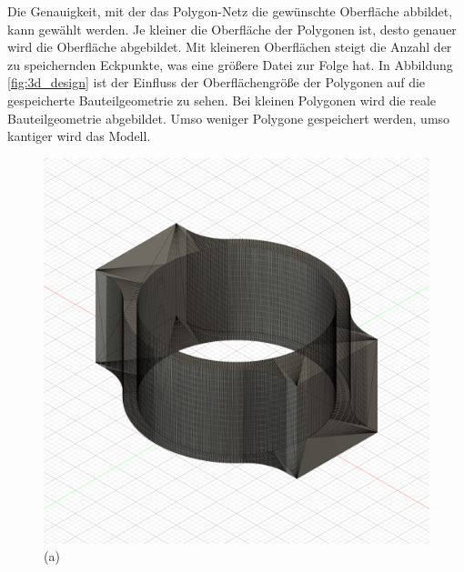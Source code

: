 Die Genauigkeit, mit der das Polygon-Netz die gewünschte Oberfläche 
abbildet, kann gewählt werden. 
Je kleiner die Oberfläche der Polygonen ist, desto genauer wird die Oberfläche 
abgebildet. Mit kleineren Oberflächen steigt die Anzahl der zu speichernden 
Eckpunkte, was eine größere Datei zur Folge hat.
In Abbildung \ref{fig:3d_design} ist der Einfluss der Oberflächengröße der Polygonen
auf die gespeicherte Bauteilgeometrie zu sehen. Bei kleinen Polygonen 
wird die reale Bauteilgeometrie abgebildet. Umso weniger Polygone gespeichert 
werden, umso kantiger wird das Modell.

\begin{figure}[H]
    \centering
    \begin{minipage}{0.32\textwidth}
        \centering
        \includegraphics[width=\linewidth]{images/image_demo.PNG} %
        \caption*{(a)}
    \end{minipage}\hfill
    \begin{minipage}{0.32\textwidth}
        \centering

\end{minipage}
\end{figure}
